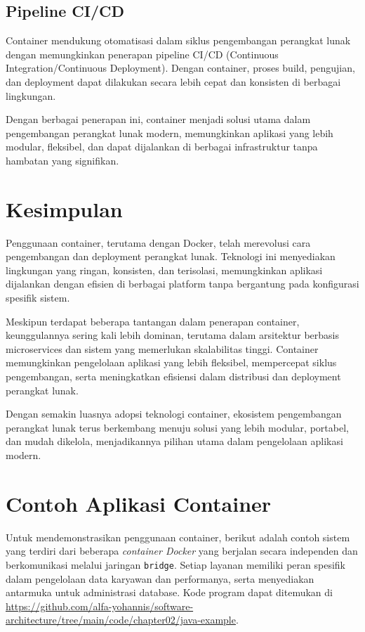 \subsection{Pipeline CI/CD}
Container mendukung otomatisasi dalam siklus pengembangan perangkat lunak dengan memungkinkan penerapan pipeline CI/CD (Continuous Integration/Continuous Deployment). Dengan container, proses build, pengujian, dan deployment dapat dilakukan secara lebih cepat dan konsisten di berbagai lingkungan.

Dengan berbagai penerapan ini, container menjadi solusi utama dalam pengembangan perangkat lunak modern, memungkinkan aplikasi yang lebih modular, fleksibel, dan dapat dijalankan di berbagai infrastruktur tanpa hambatan yang signifikan.


\section{Kesimpulan}

Penggunaan container, terutama dengan Docker, telah merevolusi cara pengembangan dan deployment perangkat lunak. Teknologi ini menyediakan lingkungan yang ringan, konsisten, dan terisolasi, memungkinkan aplikasi dijalankan dengan efisien di berbagai platform tanpa bergantung pada konfigurasi spesifik sistem.

Meskipun terdapat beberapa tantangan dalam penerapan container, keunggulannya sering kali lebih dominan, terutama dalam arsitektur berbasis microservices dan sistem yang memerlukan skalabilitas tinggi. Container memungkinkan pengelolaan aplikasi yang lebih fleksibel, mempercepat siklus pengembangan, serta meningkatkan efisiensi dalam distribusi dan deployment perangkat lunak.

Dengan semakin luasnya adopsi teknologi container, ekosistem pengembangan perangkat lunak terus berkembang menuju solusi yang lebih modular, portabel, dan mudah dikelola, menjadikannya pilihan utama dalam pengelolaan aplikasi modern.



\section{Contoh Aplikasi Container}
\label{sec:contoh_aplikasi_container}

Untuk mendemonstrasikan penggunaan container, berikut adalah contoh sistem yang terdiri dari beberapa \textit{container Docker} yang berjalan secara independen dan berkomunikasi melalui jaringan \texttt{bridge}. Setiap layanan memiliki peran spesifik dalam pengelolaan data karyawan dan performanya, serta menyediakan antarmuka untuk administrasi database. Kode program dapat ditemukan di \url{https://github.com/alfa-yohannis/software-architecture/tree/main/code/chapter02/java-example}.

